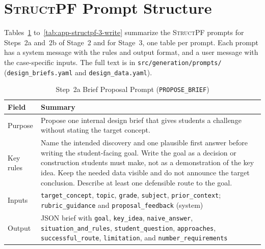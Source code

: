 \section{\textsc{StructPF} Prompt Structure}
\label{app:structpf-prompts}

Tables~\ref{tab:app-structpf-2a-propose} to~\ref{tab:app-structpf-3-write} summarize the \textsc{StructPF} prompts for Steps~2a and~2b of Stage~2 and for Stage~3, one table per prompt. Each prompt has a system message with the rules and output format, and a user message with the case-specific inputs. The full text is in \texttt{src/generation/prompts/} (\texttt{design\_briefs.yaml} and \texttt{design\_data.yaml}).

\begin{table}[!htb]
\centering
\caption[Step 2a Brief Proposal Prompt (\texttt{PROPOSE\_BRIEF})]{Step~2a Brief Proposal Prompt (\texttt{PROPOSE\_BRIEF})}
\label{tab:app-structpf-2a-propose}
\footnotesize
\setlength{\tabcolsep}{4.5pt}
\renewcommand{\arraystretch}{1.16}
\begin{tabular}{@{} >{\raggedright\arraybackslash}p{} >{\raggedright\arraybackslash}p{} @{}}
\toprule
\textbf{Field} & \textbf{Summary} \\
\midrule
Purpose & Propose one internal design brief that gives students a challenge without stating the target concept. \\
Key rules & Name the intended discovery and one plausible first answer before writing the student-facing goal. \newline Write the goal as a decision or construction students must make, not as a demonstration of the key idea. \newline Keep the needed data visible and do not announce the target conclusion. \newline Describe at least one defensible route to the goal. \\
Inputs & \texttt{target\_concept}, \texttt{topic}, \texttt{grade}, \texttt{subject}, \texttt{prior\_context}; \texttt{rubric\_guidance} and \texttt{proposal\_feedback} (system) \\
Output & JSON brief with \texttt{goal}, \texttt{key\_idea}, \texttt{naive\_answer}, \texttt{situation\_and\_rules}, \texttt{student\_question}, \texttt{approaches}, \texttt{successful\_route}, \texttt{limitation}, and \texttt{number\_requirements} \\
\bottomrule
\end{tabular}
\end{table}

